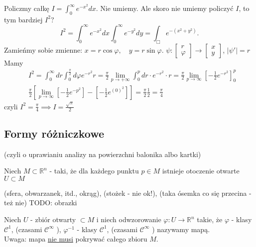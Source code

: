 \documentclass[../main.tex]{subfiles}
\begin{document}
\begin{przyklad}
    Policzmy całkę $I = \int_0^{\infty}e^{-x^2}dx$. Nie umiemy. Ale skoro nie umiemy policzyć $I$, to tym bardziej $I^2?$
    \[
        I^2 = \int_0^{\infty}e^{-x^2}dx \int_0^{\infty}e^{-y^2}dy = \int_{\Box} e^{-(x^2+y^2)}
    .\]
    Zamieńmy sobie zmienne: $x = r\cos \varphi,\quad y = r\sin \varphi$. $\psi: \begin{bmatrix} r\\\varphi\end{bmatrix}\to \begin{bmatrix} x\\y \end{bmatrix}  $, $|\psi'| = r$
     Mamy
     \begin{align*}
         &I^2 = \int_0^{\infty}dr \int_0^{\frac{\pi}{2}}d\varphi e^{-r^2}r = \frac{\pi}{2} \lim\limits_{p\to +\infty} \int_0^p dr \cdot e^{-r^2} \cdot r = \frac{\pi}{2} \lim\limits_{p\to\infty} \left[ -\frac{1}{2}e^{-r^2} \right] _0^p\\
         &\frac{\pi}{2}\left[ \lim\limits_{p\to\infty}\left[ -\frac{1}{2}e^{-p^2} \right] - \left[ -\frac{1}{2}e^{(0)^2} \right]  \right] = \frac{\pi}{2} \frac{1}{2} = \frac{\pi}{4}
     \end{align*}
     czyli $I^2 = \frac{\pi}{4} \implies I = \frac{\sqrt{\pi} }{2}$
\end{przyklad}
\subsection{Formy różniczkowe}
(czyli o uprawianiu analizy na powierzchni balonika albo kartki)

Niech $M\subset\mathbb{R}^n$ - taki, że dla każdego punktu $p\in M$ istnieje otoczenie otwarte $U\subset M$
\begin{przyklad}
    (sfera, obwarzanek, itd., okrąg), (stożek - nie ok!), (taka ósemka co się przecina - też nie)
    TODO: obrazki
\end{przyklad}
\begin{definicja}
Niech $U$ - zbiór otwarty $\subset M$ i niech odwzorowanie $\varphi: U\to \mathbb{R}^n$ takie, że $\varphi$ - klasy $\mathcal{C}^1$, (czasami $\mathcal{C}^\infty$ ), $\varphi^{-1}$ - klasy $\mathcal{C}^1$, (czasami $\mathcal{C}^\infty$ ) nazywamy mapą.\\
Uwaga: mapa \underline{nie musi} pokrywać całego zbioru $M$.
\end{definicja}
\end{document}
